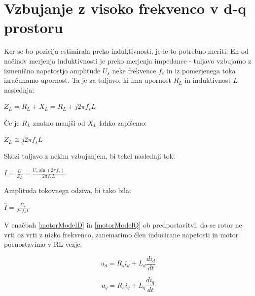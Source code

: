 \documentclass[a4paper,twoside,openright,12pt,slovene]{book}
\begin{document}

\section{Vzbujanje z visoko frekvenco v d-q prostoru}
Ker se bo pozicija estimirala preko induktivnosti, je le to potrebno meriti. En od načinov merjenja induktivnosti je preko merjenja impedance - tuljavo vzbujamo z izmenično napetostjo amplitude $U_s$
neke frekvence $f_s$ in iz pomerjenega toka izračunamo upornost. Ta je za tuljavo, ki ima upornost $R_L$ in induktivnost $L$ naslednja:

\begin{center}
    $Z_L = R_L + X_L = R_L + j2\pi f_sL$
\end{center}

Če je $R_L$ znatno manjši od $X_L$ lahko zapišemo:

\begin{center}
    $Z_L \cong j2\pi f_sL$
\end{center}

Skozi tuljavo z nekim vzbujanjem, bi tekel naslednji tok:

\begin{center}
    $I = \frac{U}{Z_L} = \frac{U_s \sin{(2\pi f_s)}}{2\pi f_sL}$
\end{center}

Amplituda tokovnega odziva, bi tako bila:

\begin{center}
    $\hat{I} = \frac{U_s}{2\pi f_sL}$
\end{center}

V enačbah \ref{motorModelD} in \ref{motorModelQ} ob predpostavitvi, da se rotor ne vrti oz vrti z nizko frekvenco, zanemarimo člen inducirane napetosti in motor poenostavimo v RL vezje:

\begin{equation} \label{motorModelD}
    u_d = R_si_d+L_d\frac{di_d}{dt}
\end{equation}

\begin{equation} \label{motorModelQ}
    u_q = R_si_q+L_q\frac{di_q}{dt}
\end{equation}
\end{document}
